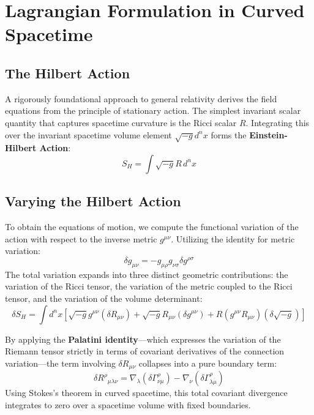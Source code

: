 \documentclass[11pt, a4paper]{report}
\begin{document}
\section*{Lagrangian Formulation in Curved Spacetime}
\subsection{The Hilbert Action}
A rigorously foundational approach to general relativity derives the field equations from the principle of stationary action. The simplest invariant scalar quantity that captures spacetime curvature is the Ricci scalar $R$. Integrating this over the invariant spacetime volume element $\sqrt{-g} d^n x$ forms the \textbf{Einstein-Hilbert Action}:
\begin{equation}
\label{eq:hilbert_action}
S_{H} = \int \sqrt{-g} R \, d^{n}x
\end{equation}

\subsection{Varying the Hilbert Action}
To obtain the equations of motion, we compute the functional variation of the action with respect to the inverse metric $g^{\mu\nu}$. Utilizing the identity for metric variation:
\begin{equation}
\label{eq:metric_variation_relation}
\delta g_{\mu\nu} = -g_{\mu\rho}g_{\nu\sigma} \delta g^{\rho\sigma}
\end{equation}
The total variation expands into three distinct geometric contributions: the variation of the Ricci tensor, the variation of the metric coupled to the Ricci tensor, and the variation of the volume determinant:
\begin{equation}
\delta S_{H} = \int d^{n}x \left[ \sqrt{-g} g^{\mu\nu} (\delta R_{\mu\nu}) + \sqrt{-g} R_{\mu\nu} (\delta g^{\mu\nu}) + R (g^{\mu\nu}R_{\mu\nu}) (\delta\sqrt{-g}) \right]
\end{equation}

By applying the \textbf{Palatini identity}—which expresses the variation of the Riemann tensor strictly in terms of covariant derivatives of the connection variation—the term involving $\delta R_{\mu\nu}$ collapses into a pure boundary term:
\begin{equation}
\label{eq:palatini_identity}
\delta{R^{\rho}}_{\mu\lambda\nu} = \nabla_{\lambda}(\delta\Gamma^{\rho}_{\nu\mu}) - \nabla_{\nu}(\delta\Gamma^{\rho}_{\lambda\mu})
\end{equation}
Using Stokes's theorem in curved spacetime, this total covariant divergence integrates to zero over a spacetime volume with fixed boundaries.
\end{document}
